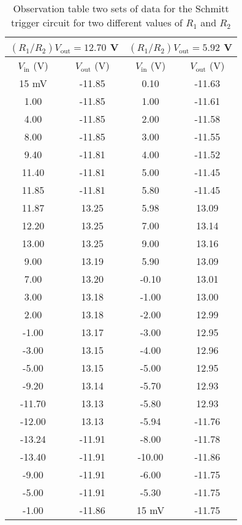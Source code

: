 \begin{table}[H]
    \centering
    \begin{tabular}{|c|c|c|c|} \hline
        \multicolumn{2}{|c|}{$(R_1/R_2) V_\text{out} = 12.70$ V} & \multicolumn{2}{c|}{$(R_1/R_2) V_\text{out}=5.92$ V} \\ \hline
        $V_\text{in}$ (V) & $V_\text{out}$ (V) & $V_\text{in}$ (V) & $V_\text{out}$ (V) \\ \hline
        15 mV & -11.85 &   0.10    & -11.63 \\
        1.00      & -11.85 &   1.00      & -11.61 \\
        4.00      & -11.85 &   2.00      & -11.58 \\
        8.00      & -11.85 &   3.00      & -11.55 \\
        9.40    & -11.81 &   4.00      & -11.52 \\
       11.40    & -11.81 &   5.00      & -11.45 \\
       11.85   & -11.81 &   5.80    & -11.45 \\
       11.87   &  13.25 &   5.98   &  13.09 \\
       12.20   &  13.25 &   7.00      &  13.14 \\
       13.00      &  13.25 &   9.00      &  13.16 \\
        9.00      &  13.19 &   5.90    &  13.09 \\
        7.00      &  13.20 &  -0.10    &  13.01 \\
        3.00      &  13.18 &  -1.00      &  13.00    \\
        2.00      &  13.18 &  -2.00      &  12.99 \\
       -1.00      &  13.17 &  -3.00      &  12.95 \\
       -3.00      &  13.15 &  -4.00      &  12.96 \\
       -5.00      &  13.15 &  -5.00      &  12.95 \\
       -9.20    &  13.14 &  -5.70    &  12.93 \\
      -11.70    &  13.13 &  -5.80    &  12.93 \\
      -12.00      &  13.13 &  -5.94   & -11.76 \\
      -13.24   & -11.91 &  -8.00      & -11.78 \\
      -13.40   & -11.91 & -10.00      & -11.86 \\
       -9.00      & -11.91 &  -6.00      & -11.75 \\
       -5.00      & -11.91 &  -5.30    & -11.75 \\
       -1.00      & -11.86 &   15 mV & -11.75 \\ \hline
    \end{tabular}    
    \caption{Observation table two sets of data for the Schmitt trigger circuit for two different values of $R_1$ and $R_2$}
    \label{tab:6}
\end{table}